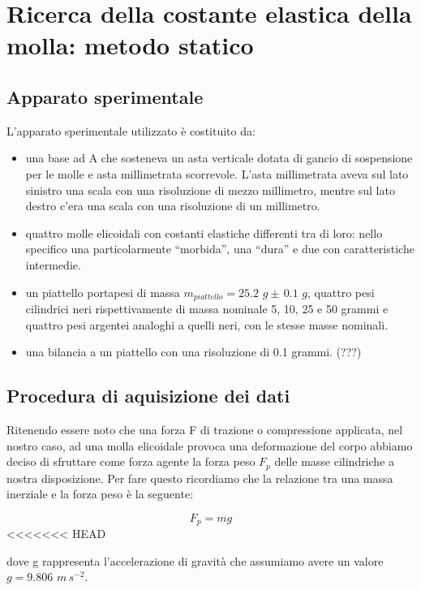 \section{Ricerca della costante elastica della molla: metodo statico}

\subsection{Apparato sperimentale}
L'apparato sperimentale utilizzato è costituito da:
	\begin{itemize}
		\item{una base ad A che sosteneva un asta verticale dotata di gancio di sospensione per le molle e asta millimetrata scorrevole. L'asta millimetrata aveva sul lato sinistro una scala con una risoluzione di mezzo millimetro, mentre sul lato destro c'era una scala con una risoluzione di un millimetro.}
		\item{quattro molle elicoidali con costanti elastiche differenti tra di loro: nello specifico una particolarmente ``morbida'', una ``dura'' e due con caratteristiche intermedie.}
		\item{un piattello portapesi di massa $m_{piattello} = 25.2\,\,g \pm\, 0.1\,\,g$, quattro pesi cilindrici neri rispettivamente di massa nominale 5, 10, 25 e 50 grammi e quattro pesi argentei analoghi a quelli neri, con le stesse masse nominali.}
        \item{una bilancia a un piattello con una risoluzione di 0.1 grammi. (???)}
	\end{itemize}

\subsection{Procedura di aquisizione dei dati}

Ritenendo essere noto che una forza F di trazione o compressione applicata, nel nostro caso, ad una molla elicoidale provoca una deformazione del corpo abbiamo deciso di sfruttare come forza agente la forza peso $F_{p}$ delle masse cilindriche a nostra disposizione. Per fare questo ricordiamo che la relazione tra una massa inerziale e la forza peso è la seguente:

\begin{equation}
	F_{p} = mg
\end{equation}
%
<<<<<<< HEAD

dove g rappresenta l'accelerazione di gravità che assumiamo avere un valore $g = 9.806\,\,m\,s^{-2}$.

